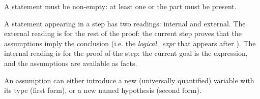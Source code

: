 \begin{syn}
 \is
\end{syn}

A statement must be non-empty: at least one  or the
 part must be present.

A statement appearing in a step has two readings: internal and
external.  The external reading is for the rest of the
proof: the current step proves that the assumptions imply the
conclusion (i.e. the {\em logical\_expr} that appears after
).  The internal reading is for the proof of the step:
the current goal is the  expression, and the
assumptions are available as facts.

\begin{syn}
 \is
      
\alt{} \tok{ :} 
\end{syn}


An assumption can either introduce a new (universally quantified)
variable with its type (first form), or a new named hypothesis (second
form).

\begin{syn}
 \is
\alt {}
\alt {}
\alt {}
\end{syn}

